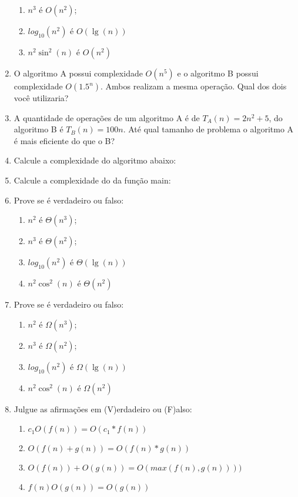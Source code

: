 \documentclass[12pt]{article}
\begin{document}
\begin{enumerate}[resume,label=\textbf{Q\arabic*}]
\begin{enumerate}
              \item $n^3$ é $O(n^2)$;
              \item $log_{10}(n^2)$ é $O(\lg(n))$
              \item $n^2\sin^2(n)$ é $O(n^2)$
          \end{enumerate}
    \item O algoritmo A possui complexidade $O(n^5)$ e o algoritmo B possui complexidade $O(1.5^n)$. Ambos realizam a mesma operação. Qual dos dois você utilizaria?
    \item A quantidade de operações de um algoritmo A é de $T_A(n) = 2n^2 + 5$, do algoritmo B é $T_B(n) = 100n$. Até qual tamanho de problema o algoritmo A é mais eficiente do que o B?
    \item Calcule a complexidade do algoritmo abaixo:
    \item Calcule a complexidade do da função main:
    \item Prove se é verdadeiro ou falso:
          \begin{enumerate}
              \item $n^2$ é $\Theta(n^3)$;
              \item $n^3$ é $\Theta(n^2)$;
              \item $log_{10}(n^2)$ é $\Theta(\lg(n))$
              \item $n^2\cos^2(n)$ é $\Theta(n^2)$
          \end{enumerate}
    \item Prove se é verdadeiro ou falso:
          \begin{enumerate}
              \item $n^2$ é $\Omega(n^3)$;
              \item $n^3$ é $\Omega(n^2)$;
              \item $log_{10}(n^2)$ é $\Omega(\lg(n))$
              \item $n^2\cos^2(n)$ é $\Omega(n^2)$
          \end{enumerate}
    \item Julgue as afirmações em (V)erdadeiro ou (F)also:
          \begin{enumerate}
              \item $c_1O(f(n)) = O(c_1*f(n))$
              \item $O(f(n) + g(n)) = O(f(n)*g(n))$
              \item $O(f(n)) + O(g(n)) = O(max(f(n),g(n))))$
              \item $f(n)O(g(n)) = O(g(n))$%
          \end{enumerate}
\end{enumerate}
\end{document}
